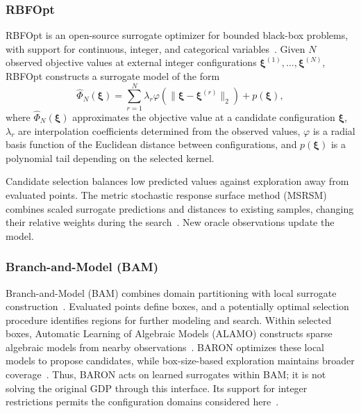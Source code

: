\documentclass{article}
\begin{document}
\subsubsection{RBFOpt}
RBFOpt is an open-source surrogate optimizer for bounded black-box problems, with support for continuous, integer, and categorical variables~\cite{costa2018rbfopt,nannicini2021implementation}. 
Given $N$ observed objective values at external integer configurations \(\boldsymbol\xi^{(1)},\ldots,\boldsymbol\xi^{(N)}\), RBFOpt constructs a surrogate model of the form
\begin{equation}\label{eqn:rbf.surrogate}
\widehat\Phi_N(\boldsymbol\xi)
=\sum_{r=1}^{N}\lambda_r\varphi\!\left(\|\boldsymbol\xi-\boldsymbol\xi^{(r)}\|_2\right)
+p(\boldsymbol\xi),
\end{equation}
where \(\widehat\Phi_N(\boldsymbol\xi)\) approximates the objective value at a candidate configuration \(\boldsymbol\xi\), \(\lambda_r\) are interpolation coefficients determined from the observed values, \(\varphi\) is a radial basis function of the Euclidean distance between configurations, and \(p(\boldsymbol\xi)\) is a polynomial tail depending on the selected kernel.

Candidate selection balances low predicted values against exploration away from evaluated points. 
The metric stochastic response surface method (MSRSM) combines scaled surrogate predictions and distances to existing samples, changing their relative weights during the search~\cite{regis2007stochastic}.  
New oracle observations update the model. 

\subsubsection{Branch-and-Model (BAM)}
Branch-and-Model (BAM) combines domain partitioning with local surrogate construction~\cite{ma2023bam}. 
Evaluated points define boxes, and a potentially optimal selection procedure identifies regions for further modeling and search. 
Within selected boxes, Automatic Learning of Algebraic Models (ALAMO) constructs sparse algebraic models from nearby observations~\cite{cozad2014learning}. 
BARON optimizes these local models to propose candidates, while box-size-based exploration maintains broader coverage~\cite{ma2023bam,bamManual,sahinidis1996baron}. 
Thus, BARON acts on learned surrogates within BAM; it is not solving the original GDP through this interface. 
Its support for integer restrictions permits the configuration domains considered here~\cite{bamManual}.
\end{document}
